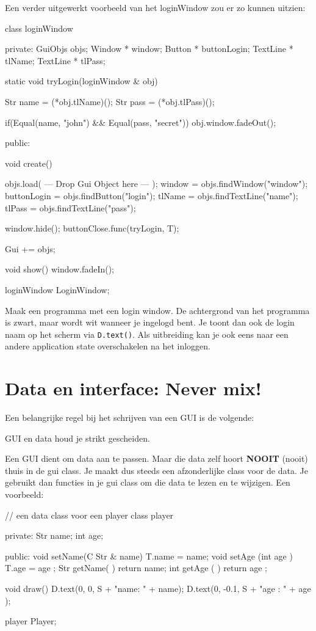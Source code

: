 Een verder uitgewerkt voorbeeld van het loginWindow zou er zo kunnen uitzien:

\begin{code}
class loginWindow
{
private:
   GuiObjs objs;
	 Window * window;
	 Button * buttonLogin;
   TextLine * tlName;
	 TextLine * tlPass;
	
   static void tryLogin(loginWindow & obj) {
	    Str name = (*obj.tlName)();
			Str pass = (*obj.tlPass)();
			
			if(Equal(name, "john") && Equal(pass, "secret")) {
			   obj.window.fadeOut();
		  }
	 }
	
public:

   void create()
   {
      objs.load( --- Drop Gui Object here --- );
      window = objs.findWindow("window");
			buttonLogin = objs.findButton("login");
			tlName = objs.findTextLine("name");
			tlPass = objs.findTextLine("pass");
			
			window.hide();
			buttonClose.func(tryLogin, T);
			
      Gui += objs;
   }
	
	 void show() {
	    window.fadeIn();
   }
}
loginWindow LoginWindow;
\end{code}

\begin{exercise}
Maak een programma met een login window. De achtergrond van het programma is zwart, maar wordt wit wanneer je ingelogd bent. Je toont dan ook de login naam op het scherm via \texttt{D.text()}. Als uitbreiding kan je ook eens naar een andere application state overschakelen na het inloggen.
\end{exercise}

\section{Data en interface: Never mix!}
Een belangrijke regel bij het schrijven van een GUI is de volgende:

\begin{note}
GUI en data houd je strikt gescheiden.
\end{note}

Een GUI dient om data aan te passen. Maar die data zelf hoort \textbf{NOOIT} (nooit) thuis in de gui class. Je maakt dus steeds een afzonderlijke class voor de data. Je gebruikt dan functies in je gui class om die data te lezen en te wijzigen. Een voorbeeld:

\begin{code}
// een data class voor een player
class player {
private:
   Str name;
	 int age;

public:
   void setName(C Str & name) { T.name = name; }
	 void setAge (int     age ) { T.age  = age ; }
	 Str  getName(            ) { return   name; }
	 int  getAge (            ) { return   age ; }
	
	 void draw() {
	    D.text(0,    0, S + "name: " + name);
			D.text(0, -0.1, S + "age : " + age );
	 }
}
player Player;
\end{code}

